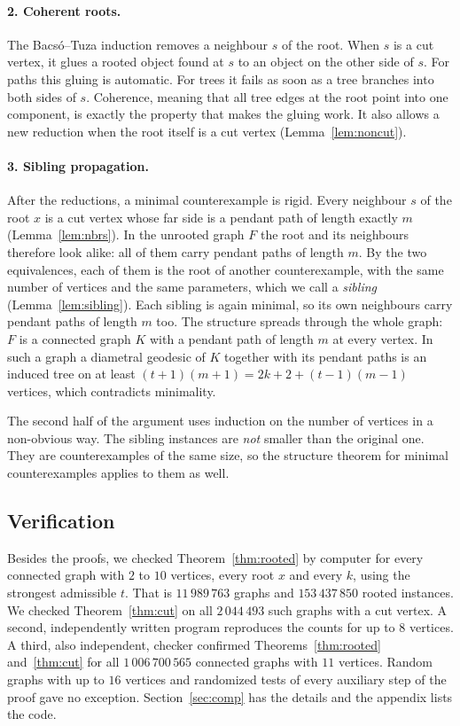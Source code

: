 \documentclass[11pt,a4paper]{article}
\theoremstyle{definition}
\begin{document}
\paragraph{2. Coherent roots.} The Bacs\'o--Tuza induction removes a neighbour $s$ of the root. When $s$ is a cut vertex, it glues a rooted object found at $s$ to an object on the other side of $s$. For paths this gluing is automatic. For trees it fails as soon as a tree branches into both sides of $s$. Coherence, meaning that all tree edges at the root point into one component, is exactly the property that makes the gluing work. It also allows a new reduction when the root itself is a cut vertex (Lemma~\ref{lem:noncut}).

\paragraph{3. Sibling propagation.} After the reductions, a minimal counterexample is rigid. Every neighbour $s$ of the root $x$ is a cut vertex whose far side is a pendant path of length exactly $m$ (Lemma~\ref{lem:nbrs}). In the unrooted graph $F$ the root and its neighbours therefore look alike: all of them carry pendant paths of length $m$. By the two equivalences, each of them is the root of another counterexample, with the same number of vertices and the same parameters, which we call a \emph{sibling} (Lemma~\ref{lem:sibling}). Each sibling is again minimal, so its own neighbours carry pendant paths of length $m$ too. The structure spreads through the whole graph: $F$ is a connected graph $K$ with a pendant path of length $m$ at every vertex. In such a graph a diametral geodesic of $K$ together with its pendant paths is an induced tree on at least $(t+1)(m+1)=2k+2+(t-1)(m-1)$ vertices, which contradicts minimality.

The second half of the argument uses induction on the number of vertices in a non-obvious way. The sibling instances are \emph{not} smaller than the original one. They are counterexamples of the same size, so the structure theorem for minimal counterexamples applies to them as well.

\subsection{Verification}

Besides the proofs, we checked Theorem~\ref{thm:rooted} by computer for every connected graph with $2$ to $10$ vertices, every root $x$ and every $k$, using the strongest admissible $t$. That is $11\,989\,763$ graphs and $153\,437\,850$ rooted instances. We checked Theorem~\ref{thm:cut} on all $2\,044\,493$ such graphs with a cut vertex. A second, independently written program reproduces the counts for up to $8$ vertices. A third, also independent, checker confirmed Theorems~\ref{thm:rooted} and~\ref{thm:cut} for all $1\,006\,700\,565$ connected graphs with $11$ vertices. Random graphs with up to $16$ vertices and randomized tests of every auxiliary step of the proof gave no exception. Section~\ref{sec:comp} has the details and the appendix lists the code.
\end{document}
